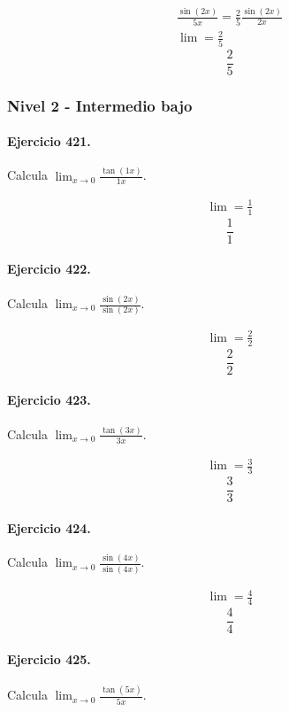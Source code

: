 \documentclass[11pt,a4paper]{article}
\begin{document}
\[
\begin{aligned}
\frac{\sin(2x)}{5x}=\frac{2}{5}\frac{\sin(2x)}{2x}\\
\lim=\frac{2}{5}
\end{aligned}
\]
\[\boxed{\frac{2}{5}}\]


\newpage

\subsubsection*{Nivel 2 - Intermedio bajo}

\paragraph{Ejercicio 421.} Calcula $\displaystyle\lim_{x\to0}\frac{\tan(1x)}{1x}$.

\[
\begin{aligned}
\lim=\frac{1}{1}
\end{aligned}
\]
\[\boxed{\frac{1}{1}}\]


\paragraph{Ejercicio 422.} Calcula $\displaystyle\lim_{x\to0}\frac{\sin(2x)}{\sin(2x)}$.

\[
\begin{aligned}
\lim=\frac{2}{2}
\end{aligned}
\]
\[\boxed{\frac{2}{2}}\]


\paragraph{Ejercicio 423.} Calcula $\displaystyle\lim_{x\to0}\frac{\tan(3x)}{3x}$.

\[
\begin{aligned}
\lim=\frac{3}{3}
\end{aligned}
\]
\[\boxed{\frac{3}{3}}\]


\paragraph{Ejercicio 424.} Calcula $\displaystyle\lim_{x\to0}\frac{\sin(4x)}{\sin(4x)}$.

\[
\begin{aligned}
\lim=\frac{4}{4}
\end{aligned}
\]
\[\boxed{\frac{4}{4}}\]


\paragraph{Ejercicio 425.} Calcula $\displaystyle\lim_{x\to0}\frac{\tan(5x)}{5x}$.
\end{document}
